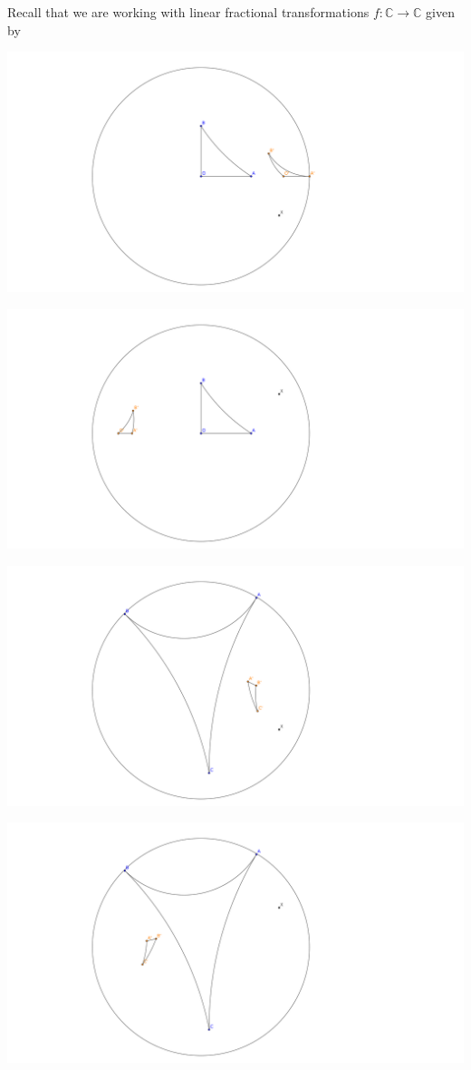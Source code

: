 \documentclass[12pt]{article}
\newcommand{\C}{\mathbb{C}}
\theoremstyle{plain}
\theoremstyle{definition}
\begin{document}
Recall that we are working with linear fractional transformations $f: \C \rightarrow \C$ given by


\includegraphics[scale=.35]{../images/triangle-1-point-reflection-2--1.png}


\includegraphics[scale=.35]{../images/triangle-1-point-reflection-2-1.png}

\includegraphics[scale=.35]{../images/triangle-2-point-reflection-2--1.png}

\includegraphics[scale=.35]{../images/triangle-2-point-reflection-2-1.png}
\end{document}
